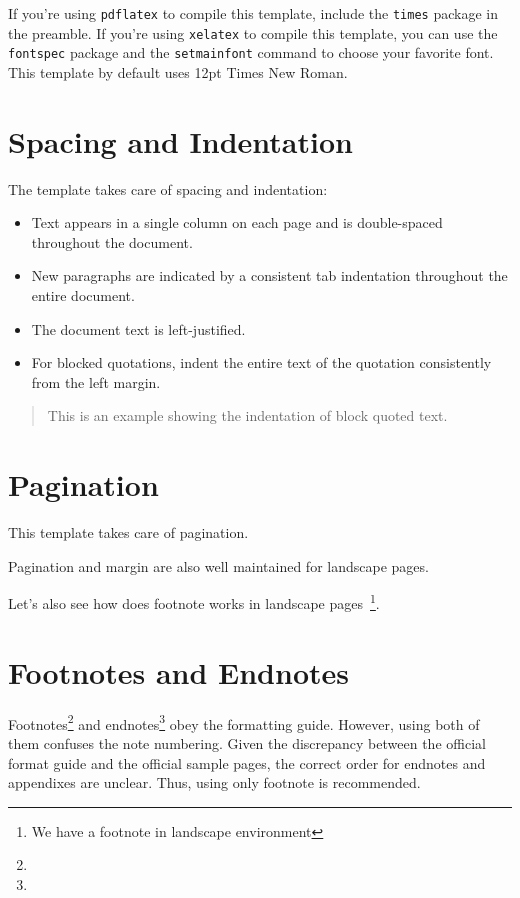 If you're using \texttt{pdflatex} to compile this template, include the \texttt{times} package in the preamble.
If you're using \texttt{xelatex} to compile this template, you can use the \texttt{fontspec} package and the \texttt{setmainfont} command to choose your favorite font.
This template by default uses 12pt Times New Roman.

\section{Spacing and Indentation}

The template takes care of spacing and indentation:
\begin{itemize}
    \item Text appears in a single column on each page and is double-spaced throughout the document.
    \item New paragraphs are indicated by a consistent tab indentation throughout the entire document.
    \item The document text is left-justified.
    \item For blocked quotations, indent the entire text of the quotation consistently from the left margin.
\end{itemize}

\lipsum[6]
\begin{quote}
    This is an example showing the indentation of block quoted text.
    \lipsum[8]
\end{quote}
\lipsum[7]

\section{Pagination}
This template takes care of pagination.

Pagination and margin are also well maintained for landscape pages.
\begin{landscape}
    \lipsum[9] Let's also see how does footnote works in landscape pages~\footnote{We have a footnote in landscape environment}.
\end{landscape}

\section{Footnotes and Endnotes}
Footnotes\footnote{\lipsum[10]} and endnotes\footnote{\lipsum[11]} obey the
formatting guide. However, using both of them confuses the note numbering.
Given the discrepancy between the official format guide\endnote{\lipsum[12]}
and the official sample pages\endnote{\lipsum[14]}, the correct order for
endnotes and appendixes are unclear.  Thus, using only footnote is recommended.

